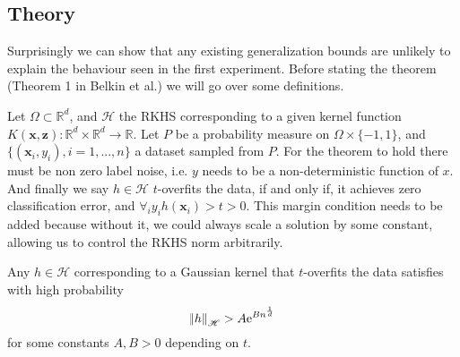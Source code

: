 
\subsection{Theory}

Surprisingly we can show that any existing generalization bounds are unlikely to explain the behaviour seen in the first experiment. Before stating the theorem (Theorem 1 in Belkin et al.) we will go over some definitions.

Let $\Omega \subset \mathbb{R}^d$, and $\mathscr{H}$ the RKHS corresponding to a given kernel function $K(\mathbf{x}, \mathbf{z}) : \mathbb{R}^d \times \mathbb{R}^d \rightarrow \mathbb{R}$. Let $P$ be a probability measure on  $\Omega \times \{-1, 1\}$, and $\{(\mathbf{x}_i, y_i), i=1,...,n\}$ a dataset sampled from $P$. For the theorem to hold there must be non zero label noise, i.e. $y$ needs to be a non-deterministic function of $x$. And finally we say $h \in \mathscr{H}$ $t$-overfits the data, if and only if, it achieves zero classification error, and $\forall_i y_i h(\mathbf{x}_i) > t > 0$. This margin condition needs to be added because without it, we could always scale a solution by some constant, allowing us to control the RKHS norm arbitrarily.







\begin{theorem}
\label{theorem}
Any $h \in \mathscr{H}$ corresponding to a Gaussian kernel that $t$-overfits the data satisfies with high probability
\begin{equation}
\norm{h}_\mathscr{H} > A \mathrm{e}^{B n^\frac{1}{d}} 
\end{equation}
for some constants $A, B > 0$ depending on $t$.
\end{theorem}


